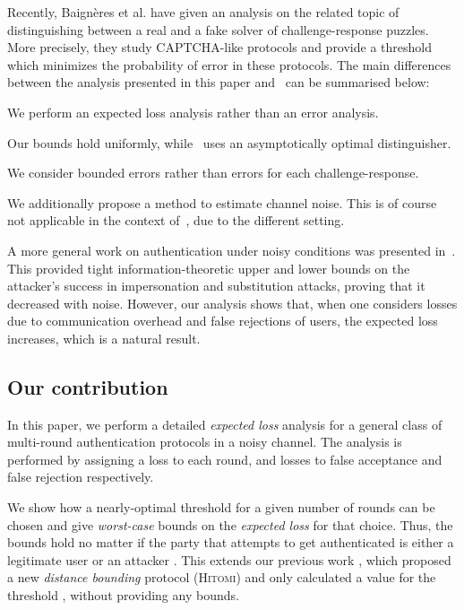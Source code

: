 \documentclass[a4paper]{article}
\newcommand \Hitomi {\textsc{Hitomi}}
\theoremstyle{plain} \newtheorem{remark}{Remark}
\theoremstyle{plain} \newtheorem{definition}{Definition}
\theoremstyle{plain} \newtheorem{example}{Example}
\theoremstyle{plain} \newtheorem{assumption}{Assumption}
\theoremstyle{plain} \newtheorem{conjecture}{Conjecture}
\theoremstyle{plain} \newtheorem{theorem}{Theorem}
\theoremstyle{plain} \newtheorem{proposition}{Proposition}
\theoremstyle{plain} \newtheorem{lemma}{Lemma}
\theoremstyle{plain} \newtheorem{corollary}{Corollary}
\begin{document}
Recently, Baign\`{e}res et al. \cite{ProvSec2010} have given an
analysis on the related topic of distinguishing between a real and a
fake solver of challenge-response puzzles. More precisely, they study
CAPTCHA-like protocols and provide a threshold which minimizes the
probability of error in these protocols.  The main differences between
the analysis presented in this paper and~\cite{ProvSec2010} can be
summarised below: \begin{inparaenum}[(a)]
\item We perform an expected loss analysis rather than an error
  analysis.
\item Our bounds hold uniformly, while~\cite{ProvSec2010} uses an asymptotically optimal distinguisher.
\item We consider bounded errors rather than  errors for each
  challenge-response.
\item We additionally propose a method to estimate channel noise.
  This is of course not applicable in the context
  of~\cite{ProvSec2010}, due to the different setting.
\end{inparaenum}

A more general work on authentication under noisy conditions was
presented in~\cite{lai}.  This provided tight information-theoretic
upper and lower bounds on the attacker's success in impersonation and
substitution attacks, proving that it decreased with noise.  However,
our analysis shows that, when one considers losses due to
communication overhead and false rejections of users, the expected
loss increases, which is a natural result.

\subsection{Our contribution}
In this paper, we perform a detailed \textit{expected loss} analysis
for a general class of multi-round authentication protocols in a noisy
channel. The analysis is performed by assigning a loss  to each round,
and losses  to false acceptance and false rejection respectively.

We show how a nearly-optimal threshold  for a given number of
rounds  can be chosen and give {\em worst-case} bounds on the
\textit{expected loss} for that choice.  Thus, the bounds hold no
matter if the party that attempts to get authenticated is either a
legitimate user  or an attacker . This extends our previous work
\cite{sheddingLight}, which proposed a new \textit{distance bounding}
protocol ({\Hitomi}) and only calculated a value for the threshold
, without providing any bounds.
\end{document}
